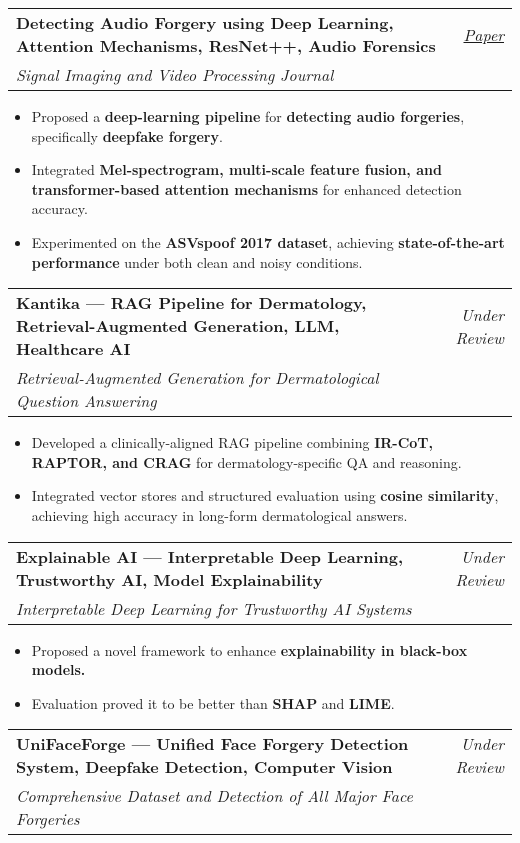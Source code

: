 \documentclass[a4paper,11pt]{article}
\makeatletter
\newcommand{\resumeProject}[4]{
\vspace{0.5mm}\item
    \begin{tabular*}{0.98\textwidth}[t]{l@{\extracolsep{\fill}}r}
        \textbf{#1} & \textit{\footnotesize{#3}} \\
        \footnotesize{\textit{#2}} & \footnotesize{#4}
    \end{tabular*}
    \vspace{-2.4mm}
}
\newcommand{\resumeItemListStart}{\begin{itemize}[leftmargin=*,labelsep=1mm,itemsep=0.5mm]}
\newcommand{\resumeItemListEnd}{\end{itemize}\vspace{-2mm}}
\makeatother
\begin{document}
\resumeProject
    {Detecting Audio Forgery using Deep Learning, Attention Mechanisms, ResNet++, Audio Forensics}
    {Signal Imaging and Video Processing Journal}{\href{https://link.springer.com/article/10.1007/s11760-025-04521-w}{Paper}}
    {}
\resumeItemListStart
    \item Proposed a \textbf{deep-learning pipeline} for \textbf{detecting audio forgeries}, specifically \textbf{deepfake forgery}.
    \item Integrated \textbf{Mel-spectrogram, multi-scale feature fusion, and transformer-based attention mechanisms} for enhanced detection accuracy.
    \item Experimented on the \textbf{ASVspoof 2017 dataset}, achieving \textbf{state-of-the-art performance} under both clean and noisy conditions.
\resumeItemListEnd

\resumeProject
    {Kantika — RAG Pipeline for Dermatology, Retrieval-Augmented Generation, LLM, Healthcare AI}
    {Retrieval-Augmented Generation for Dermatological Question Answering}
    {Under Review}
    {}

\resumeItemListStart
    \item Developed a clinically-aligned RAG pipeline combining \textbf{IR-CoT, RAPTOR, and CRAG} for dermatology-specific QA and reasoning.
    \item Integrated vector stores and structured evaluation using \textbf{cosine similarity}, achieving high accuracy in long-form dermatological answers.
\resumeItemListEnd

\resumeProject
    {Explainable AI — Interpretable Deep Learning, Trustworthy AI, Model Explainability}
    {Interpretable Deep Learning for Trustworthy AI Systems}
    {Under Review}
    {}

\resumeItemListStart
    \item Proposed a novel framework to enhance \textbf{explainability in black-box models.} 
    \item Evaluation proved it to be better than \textbf{SHAP} and \textbf{LIME}.
\resumeItemListEnd

\resumeProject
    {UniFaceForge — Unified Face Forgery Detection System, Deepfake Detection, Computer Vision}
    {Comprehensive Dataset and Detection of All Major Face Forgeries}
    {Under Review}
    {}
\end{document}
